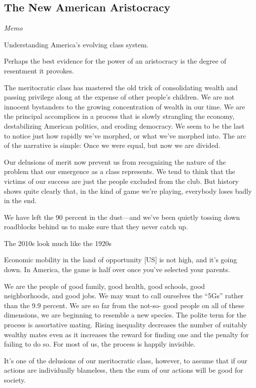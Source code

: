 \documentclass[
]{book}
\begin{document}
\hypertarget{the-new-american-aristocracy}{%
\subsection{The New American Aristocracy}\label{the-new-american-aristocracy}}

\emph{Memo}

Understanding America's evolving class system.

Perhaps the best evidence for the power of an aristocracy is
the degree of resentment it provokes.

The meritocratic class has mastered the old trick of consolidating
wealth and passing privilege along at the expense of other people's
children. We are not innocent bystanders to the growing
concentration of wealth in our time. We are the principal
accomplices in a process that is slowly strangling the economy,
destabilizing American politics, and eroding democracy.
We seem to be the last to notice just
how rapidly we've morphed, or what we've morphed into.
The arc of the narrative is simple: Once we
were equal, but now we are divided.

Our delusions of merit now prevent us from recognizing the nature of the
problem that our emergence as a class represents. We tend to think
that the victims of our success are just the people excluded from the
club. But history shows quite clearly that, in the kind of game we're
playing, everybody loses badly in the end.

We have left the 90 percent
in the dust---and we've been quietly tossing down roadblocks behind
us to make sure that they never catch up.

The 2010s look much like the 1920s

Economic mobility in the land of
opportunity {[}US{]} is not high, and it's going down.
In America, the game is half over
once you've selected your parents.

We are the people of good family, good health, good schools, good
neighborhoods, and good jobs. We may want to call ourselves the
``5Gs'' rather than the 9.9 percent.
We are so far from the not-so-
good people on all of these dimensions, we are beginning to resemble
a new species.
The polite term for the process is assortative mating.
Rising inequality decreases the
number of suitably wealthy mates even as it increases the reward for
finding one and the penalty for failing to do so.
For most of us, the process is happily invisible.

It's one of the
delusions of our meritocratic class, however, to assume that if our
actions are individually blameless, then the sum of our actions will be
good for society.
\end{document}
